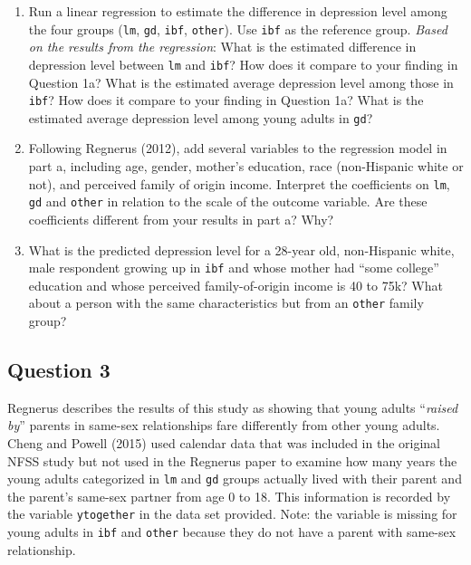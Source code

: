 \documentclass[]{article}
\begin{document}
\begin{enumerate}
\def\labelenumi{\alph{enumi}.}
\item
  Run a linear regression to estimate the difference in depression level
  among the four groups (\texttt{lm}, \texttt{gd}, \texttt{ibf},
  \texttt{other}). Use \texttt{ibf} as the reference group. \emph{Based
  on the results from the regression}: What is the estimated difference
  in depression level between \texttt{lm} and \texttt{ibf}? How does it
  compare to your finding in Question 1a? What is the estimated average
  depression level among those in \texttt{ibf}? How does it compare to
  your finding in Question 1a? What is the estimated average depression
  level among young adults in \texttt{gd}?
\item
  Following Regnerus (2012), add several variables to the regression
  model in part a, including age, gender, mother's education, race
  (non-Hispanic white or not), and perceived family of origin income.
  Interpret the coefficients on \texttt{lm}, \texttt{gd} and
  \texttt{other} in relation to the scale of the outcome variable. Are
  these coefficients different from your results in part a? Why?
\item
  What is the predicted depression level for a 28-year old, non-Hispanic
  white, male respondent growing up in \texttt{ibf} and whose mother had
  ``some college'' education and whose perceived family-of-origin income
  is 40 to 75k? What about a person with the same characteristics but
  from an \texttt{other} family group?
\end{enumerate}

\subsection{Question 3}\label{question-3}

Regnerus describes the results of this study as showing that young
adults ``\emph{raised by}'' parents in same-sex relationships fare
differently from other young adults. Cheng and Powell (2015) used
calendar data that was included in the original NFSS study but not used
in the Regnerus paper to examine how many years the young adults
categorized in \texttt{lm} and \texttt{gd} groups actually lived with
their parent and the parent's same-sex partner from age 0 to 18. This
information is recorded by the variable \texttt{ytogether} in the data
set provided. Note: the variable is missing for young adults in
\texttt{ibf} and \texttt{other} because they do not have a parent with
same-sex relationship.
\end{document}
